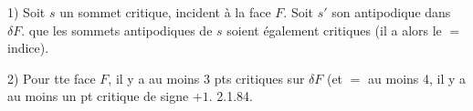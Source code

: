 1) Soit \(s\) un sommet critique, incident à la face \(F\). Soit \(s'\) son antipodique dans \(\delta F\).  que les sommets antipodiques de \(s\) soient également critiques (il a alors le $=$ indice).

2) Pour tte face \(F\), il y a au moins 3 pts critiques sur \(\delta F\) (et $=$ au moins 4,  il y a au moins un pt critique de signe \(+1\).  
2.1.84.

